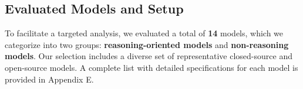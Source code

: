 \documentclass[letterpaper]{article} %
\begin{document}

\subsection{Evaluated Models and Setup}
To facilitate a targeted analysis, we evaluated a total of \textbf{14} models, which we categorize into two groups: \textbf{reasoning-oriented models} and \textbf{non-reasoning models}. Our selection includes a diverse set of representative closed-source and open-source models. A complete list with detailed specifications for each model is provided in Appendix E.
\end{document}
